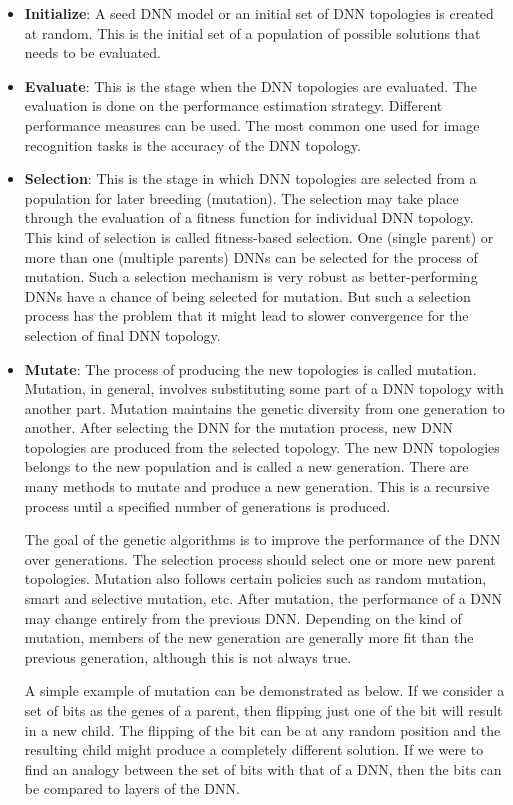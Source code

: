 \begin{itemize}
    \item \textbf{Initialize}: A seed DNN model or an initial set of DNN topologies is created at random. This is the initial set of a population of possible solutions that needs to be evaluated.
    \item \textbf{Evaluate}: This is the stage when the DNN topologies are evaluated. The evaluation is done on the performance estimation strategy. Different performance measures can be used. The most common one used for image recognition tasks is the accuracy of the DNN topology. 
    \item \textbf{Selection}: This is the stage in which DNN topologies are selected from a population for later breeding (mutation). The selection may take place through the evaluation of a fitness function for individual DNN topology. This kind of selection is called fitness-based selection. One (single parent) or more than one (multiple parents) DNNs can be selected for the process of mutation. Such a selection mechanism is very robust as better-performing DNNs have a chance of being selected for mutation. But such a selection process has the problem that it might lead to slower convergence for the selection of final DNN topology. 
    \item \textbf{Mutate}: The process of producing the new topologies is called mutation. Mutation, in general, involves substituting some part of a DNN topology with another part. Mutation maintains the genetic diversity from one generation to another. After selecting the DNN for the mutation process, new DNN topologies are produced from the selected topology. The new DNN topologies belongs to the new population and is called a new generation. There are many methods to mutate and produce a new generation. This is a recursive process until a specified number of generations is produced.

    The goal of the genetic algorithms is to improve the performance of the DNN over generations. The selection process should select one or more new parent topologies. Mutation also follows certain policies such as random mutation, smart and selective mutation, etc. After mutation, the performance of a DNN may change entirely from the previous DNN. Depending on the kind of mutation, members of the new generation are generally more fit than the previous generation, although this is not always true. 
    
    A simple example of mutation can be demonstrated as below. If we consider a set of bits as the genes of a parent, then flipping just one of the bit will result in a new child. The flipping of the bit can be at any random position and the resulting child might produce a completely different solution. If we were to find an analogy between the set of bits with that of a DNN, then the bits can be compared to layers of the DNN.
    

\end{itemize}

